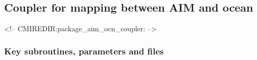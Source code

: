 \subsection{Coupler for mapping between AIM and ocean }
\label{sec:pkg:aim_ocn_coupler}
\begin{rawhtml}
<!-- CMIREDIR:package_aim_ocn_coupler: -->
\end{rawhtml}

\subsubsection{Key subroutines, parameters and files}
\label{sec:pkg:aim_ocn_coupler:implementation_synopsis}
